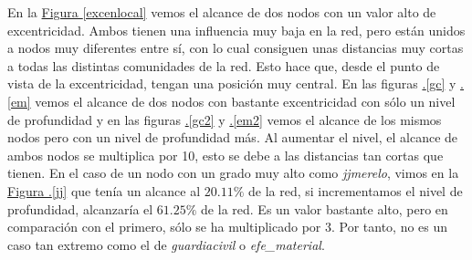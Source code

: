 \documentclass[10pt,a4paper,spanish]{article}
\numberwithin{equation}{section} %
\numberwithin{figure}{section} %
\numberwithin{table}{section} %
\begin{document}
En la \hyperref[excenlocal]{Figura \ref*{excenlocal}} vemos el alcance de dos nodos con un valor alto de excentricidad. Ambos tienen una influencia muy baja en la red, pero están unidos a nodos muy diferentes entre sí, con lo cual consiguen unas distancias muy cortas a todas las distintas comunidades de la red. Esto hace que, desde el punto de vista de la excentricidad, tengan una posición muy central. En las figuras \hyperref[gc]{\thesection .\ref*{gc}} y \hyperref[em]{\thesection .\ref*{em}} vemos el alcance de dos nodos con bastante excentricidad con sólo un nivel de profundidad y en las figuras \hyperref[gc]{\thesection .\ref*{gc2}} y \hyperref[em]{\thesection .\ref*{em2}} vemos el alcance de los mismos nodos pero con un nivel de profundidad más. Al aumentar el nivel, el alcance de ambos nodos se multiplica por 10, esto se debe a las distancias tan cortas que tienen. En el caso de un nodo con un grado muy alto como \textit{jjmerelo}, vimos en la \hyperref[jj]{Figura \thesection .\ref*{jj}} que tenía un alcance al $20.11\%$ de la red, si incrementamos el nivel de profundidad, alcanzaría el $61.25\%$ de la red. Es un valor bastante alto, pero en comparación con el primero, sólo se ha multiplicado por 3. Por tanto, no es un caso tan extremo como el de \textit{guardiacivil} o \textit{efe\_material}.
\end{document}
